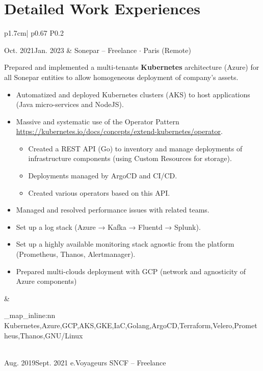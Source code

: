 \documentclass[darkhipster]{hipstercv}
\newcommand{\cvsection}[1] {%
    \section*{\textbf{#1}}
}%
\newcommand{\cvtags}[1] {
    \clist_map_inline:nn { #1 }
    {
        \cvtag{##1} %
    }
}
\newcommand{\cveventdetailed}[9]{
    {\small #1} &
    {#2 $\cdot$ \small{{#4 ~\faMapMarker}}}\vspace{.5em}\newline
    {\color{black!70}\footnotesize #5\vspace{#9}} &
    {\raisebox{-0.7\height}{\texttt{[image: \#6]}}} \vspace{#7}
    {\par \small \cvtags{#8}}
}
\begin{document}



\cvsection{Detailed Work Experiences}
\begin{longtable}{p{1.7cm}| p{} P{0.2\textwidth}}
    \cveventdetailed
        {Oct. 2021\newline Jan. 2023}
        {Sonepar -- Freelance}
        {SRE/Architect}
        {Paris (Remote)\color{cvred}}
        {
            Prepared and implemented a multi-tenants {\bfseries Kubernetes} architecture (Azure) for all Sonepar entities to allow homogeneous deployment of company's assets.
            \begin{itemize}
                \item Automatized and deployed Kubernetes clusters (AKS) to host applications (Java micro-services and NodeJS).
                \item Massive and systematic use of the Operator Pattern \url{https://kubernetes.io/docs/concepts/extend-kubernetes/operator}.
                \begin{itemize}
                    \item Created a REST API (Go) to inventory and manage deployments of infrastructure components (using Custom Resources for storage).
                    \item Deployments managed by ArgoCD and CI/CD.
                    \item Created various operators based on this API.
                \end{itemize}
                \item Managed and resolved performance issues with related teams.
                \item Set up a log stack (Azure → Kafka → Fluentd → Splunk).
                \item Set up a highly available monitoring stack agnostic from the platform (Prometheus, Thanos, Alertmanager).
                \item Prepared multi-clouds deployment with GCP (network and agnosticity of Azure components)
            \end{itemize}
        }
        {sonepar.png}{0.5em}{Kubernetes,Azure,GCP,AKS,GKE,IaC,Golang,ArgoCD,Terraform,Velero,Prometheus,Thanos,GNU/Linux}
        {.3em} \\
    \cveventdetailed
        {Aug. 2019\newline Sept. 2021}
        {e.Voyageurs SNCF -- Freelance}

\end{longtable}
\end{document}
